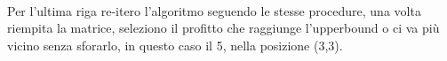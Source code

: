 \documentclass{article}
\begin{document}
\\
Per l'ultima riga re-itero l'algoritmo seguendo le stesse procedure, una volta riempita la matrice, seleziono il profitto che raggiunge l'upperbound o ci va più vicino senza sforarlo, in questo caso il 5, nella posizione (3,3).

\end{document}
